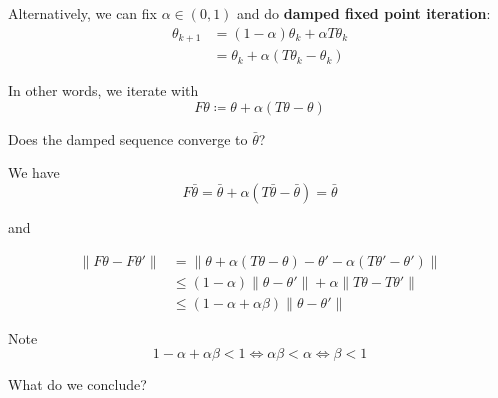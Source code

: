 \documentclass[xcolor=dvipsnames]{beamer}  %
\renewcommand{\leq}{\leqslant}
\newcommand{\emp}[1]{\textcolor{DarkOrange1}{\bf #1}}
\newcommand{\1}{\mathbbm 1}
\begin{document}
\begin{frame}
    
    Alternatively, we can
    fix $\alpha \in (0,1)$ and do \emp{damped fixed point iteration}:
    \begin{align*}
        \theta_{k+1} 
        & = (1-\alpha) \theta_k + \alpha T \theta_k
        \\
        & =  \theta_k + \alpha (T \theta_k - \theta_k)
    \end{align*}

    In other words, we iterate with
    \begin{equation*}
        F\theta \coloneq \theta + \alpha (T\theta - \theta)
    \end{equation*}


\end{frame}




\begin{frame}

    Does the damped sequence converge to $\bar \theta$?

    \vspace{0.5em}
    \vspace{0.5em}
    We have
    \begin{equation*}
        F \bar \theta 
        = \bar \theta + \alpha (T \bar \theta - \bar \theta)
        = \bar \theta
    \end{equation*}

    \vspace{0.5em}
    and

    \begin{align*}
        \| F\theta - F\theta'\|
        & = \| 
            \theta + \alpha (T\theta - \theta)
            - \theta' - \alpha (T\theta' - \theta')
        \|
        \\
        & \leq (1-\alpha)\|\theta - \theta'\| + \alpha \| T\theta - T\theta'\|
        \\
        & \leq (1-\alpha + \alpha \beta)\| \theta - \theta'\|
    \end{align*}

    Note 
    \begin{equation*}
        1-\alpha + \alpha \beta < 1
        \iff \alpha \beta < \alpha
        \iff \beta < 1
    \end{equation*}
    
\end{frame}


\begin{frame}
    
    What do we conclude?
\end{frame}
\end{document}
